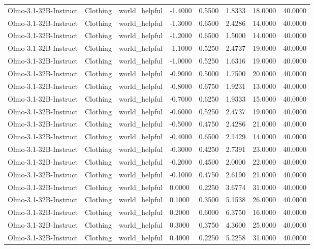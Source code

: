 \begin{table}
\begin{tabular}{llllrrrr}
Olmo-3.1-32B-Instruct & Clothing & world_helpful & -1.4000 & 0.5500 & 1.8333 & 18.0000 & 40.0000 \\
Olmo-3.1-32B-Instruct & Clothing & world_helpful & -1.3000 & 0.6500 & 2.4286 & 14.0000 & 40.0000 \\
Olmo-3.1-32B-Instruct & Clothing & world_helpful & -1.2000 & 0.6500 & 1.5000 & 14.0000 & 40.0000 \\
Olmo-3.1-32B-Instruct & Clothing & world_helpful & -1.1000 & 0.5250 & 2.4737 & 19.0000 & 40.0000 \\
Olmo-3.1-32B-Instruct & Clothing & world_helpful & -1.0000 & 0.5250 & 1.6316 & 19.0000 & 40.0000 \\
Olmo-3.1-32B-Instruct & Clothing & world_helpful & -0.9000 & 0.5000 & 1.7500 & 20.0000 & 40.0000 \\
Olmo-3.1-32B-Instruct & Clothing & world_helpful & -0.8000 & 0.6750 & 1.9231 & 13.0000 & 40.0000 \\
Olmo-3.1-32B-Instruct & Clothing & world_helpful & -0.7000 & 0.6250 & 1.9333 & 15.0000 & 40.0000 \\
Olmo-3.1-32B-Instruct & Clothing & world_helpful & -0.6000 & 0.5250 & 2.4737 & 19.0000 & 40.0000 \\
Olmo-3.1-32B-Instruct & Clothing & world_helpful & -0.5000 & 0.4750 & 2.4286 & 21.0000 & 40.0000 \\
Olmo-3.1-32B-Instruct & Clothing & world_helpful & -0.4000 & 0.6500 & 2.1429 & 14.0000 & 40.0000 \\
Olmo-3.1-32B-Instruct & Clothing & world_helpful & -0.3000 & 0.4250 & 2.7391 & 23.0000 & 40.0000 \\
Olmo-3.1-32B-Instruct & Clothing & world_helpful & -0.2000 & 0.4500 & 2.0000 & 22.0000 & 40.0000 \\
Olmo-3.1-32B-Instruct & Clothing & world_helpful & -0.1000 & 0.4750 & 2.6190 & 21.0000 & 40.0000 \\
Olmo-3.1-32B-Instruct & Clothing & world_helpful & 0.0000 & 0.2250 & 3.6774 & 31.0000 & 40.0000 \\
Olmo-3.1-32B-Instruct & Clothing & world_helpful & 0.1000 & 0.3500 & 5.1538 & 26.0000 & 40.0000 \\
Olmo-3.1-32B-Instruct & Clothing & world_helpful & 0.2000 & 0.6000 & 6.3750 & 16.0000 & 40.0000 \\
Olmo-3.1-32B-Instruct & Clothing & world_helpful & 0.3000 & 0.3750 & 4.3600 & 25.0000 & 40.0000 \\
Olmo-3.1-32B-Instruct & Clothing & world_helpful & 0.4000 & 0.2250 & 5.2258 & 31.0000 & 40.0000 \\

\end{tabular}
\end{table}
